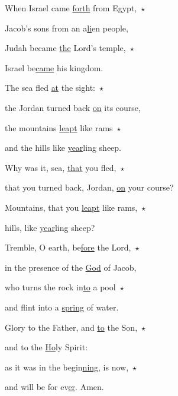 \noindent When Israel came \uline{forth} from Egypt,~$\star$~

Jacob’s sons from an a\uline{li}en people,

\noindent Judah became \uline{the} Lord’s temple,~$\star$~

Israel be\uline{came} his kingdom.

\noindent The sea fled \uline{at} the sight:~$\star$~

the Jordan turned back \uline{on} its course,

\noindent the mountains \uline{leapt} like rams~$\star$~

and the hills like \uline{year}ling sheep.

\noindent Why was it, sea, \uline{that} you fled,~$\star$~

that you turned back, Jordan, \uline{on} your course?

\noindent Mountains, that you \uline{leapt} like rams,~$\star$~

hills, like \uline{year}ling sheep?

\noindent Tremble, O earth, be\uline{fore} the Lord,~$\star$~

in the presence of the \uline{God} of Jacob,

\noindent who turns the rock in\uline{to} a pool~$\star$~

and flint into a \uline{spring} of water.

\noindent Glory to the Father, and \uline{to} the Son,~$\star$~

and to the \uline{Ho}ly Spirit:

\noindent as it was in the begin\uline{ning}, is now,~$\star$~

and will be for ev\uline{er}. Amen.